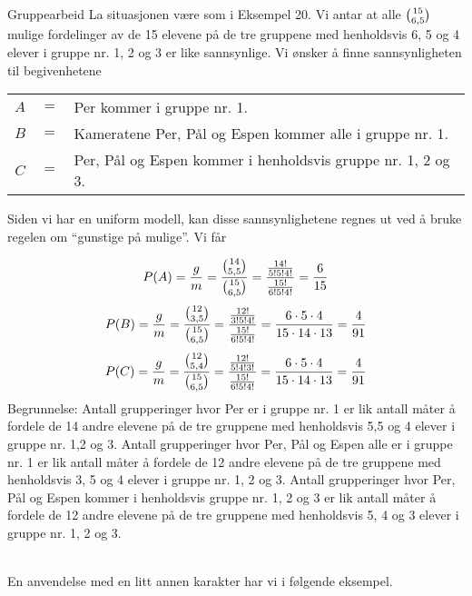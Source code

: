 \begin{eksempel}{Gruppearbeid}
La situasjonen være som i Eksempel 20. Vi antar at alle ${{15}\choose{6,5}}$  
mulige fordelinger av de 15 elevene på de tre gruppene med
henholdsvis 6, 5 og 4 elever i gruppe nr. 1, 2 og 3 er like
sannsynlige. Vi ønsker å finne sannsynligheten til begivenhetene
\begin{center}
\begin{tabular}{ccl}
    $A$&$=$& Per kommer i gruppe nr. 1. \\                           
    $B$&$=$& Kameratene Per, Pål og Espen kommer alle i gruppe nr. 1.\\
    $C$&$=$& Per, Pål og Espen kommer i henholdsvis gruppe nr. 1, 2 og 3.\\
\end{tabular}
\end{center}
Siden vi har en uniform modell, kan disse sannsynlighetene regnes
ut ved å bruke regelen om ``gunstige på mulige''. Vi får 

 \[ P(A)=\frac{g}{m}=\frac{{{14}\choose{5,5}}}{{{15}\choose{6,5}}}=
     \frac{\frac{14!}{5!5!4!}}{\frac{15!}{6!5!4!}}=\frac{6}{15} \]
 \[ P(B)=\frac{g}{m}=\frac{{{12}\choose{3,5}}}{{{15}\choose{6,5}}}=
     \frac{\frac{12!}{3!5!4!}}{\frac{15!}{6!5!4!}}=
    \frac{6 \cdot 5 \cdot 4}{15 \cdot 14 \cdot 13}=\frac{4}{91} \]
 \[ P(C)=\frac{g}{m}=\frac{{{12}\choose{5,4}}}{{{15}\choose{6,5}}}=
     \frac{\frac{12!}{5!4!3!}}{\frac{15!}{6!5!4!}}=
          \frac{6 \cdot 5 \cdot 4}{15 \cdot 14 \cdot 13}=\frac{4}{91} \]
\noindent Begrunnelse: Antall grupperinger hvor Per er i gruppe nr. 1 er
lik antall måter å fordele de 14 andre elevene på de tre gruppene
med henholdsvis 5,5 og 4 elever i gruppe nr. 1,2 og 3. Antall
grupperinger hvor Per, Pål og Espen alle er i gruppe nr. 1 er lik
antall måter å fordele de 12 andre elevene på de tre gruppene med
henholdsvis 3, 5 og 4 elever i gruppe nr. 1, 2 og 3. Antall
grupperinger hvor Per, Pål og Espen kommer i henholdsvis gruppe
nr. 1, 2 og 3 er lik antall måter å fordele de 12 andre elevene
på de tre gruppene med henholdsvis 5, 4 og 3 elever i gruppe nr.
1, 2 og 3. \\ \\
\end{eksempel}
En anvendelse med en litt annen karakter har vi i følgende
eksempel.\\

